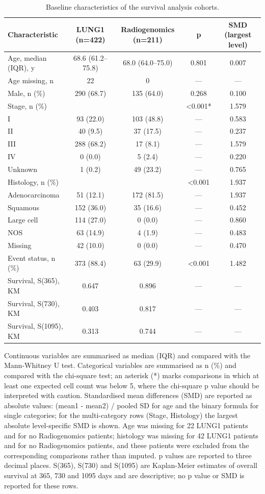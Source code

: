 \documentclass[a4paper,fleqn]{cas-sc}
\begin{document}
\begin{table}[htbp]
\centering
\small
\setlength{\tabcolsep}{4pt}
\caption{Baseline characteristics of the survival analysis cohorts.}
\label{tbl:1}
\begin{tabular}{@{}lcccc@{}}
\toprule
Characteristic & LUNG1 (n=422) & Radiogenomics (n=211) & p & SMD (largest level) \\
\midrule
Age, median (IQR), y & 68.6 (61.2--75.8) & 68.0 (64.0--75.0) & 0.801 & 0.007 \\
Age missing, n & 22 & 0 & --- & --- \\
Male, n (\%) & 290 (68.7) & 135 (64.0) & 0.268 & 0.100 \\
Stage, n (\%) &  &  & <0.001* & 1.579 \\
  I & 93 (22.0) & 103 (48.8) & --- & 0.583 \\
  II & 40 (9.5) & 37 (17.5) & --- & 0.237 \\
  III & 288 (68.2) & 17 (8.1) & --- & 1.579 \\
  IV & 0 (0.0) & 5 (2.4) & --- & 0.220 \\
  Unknown & 1 (0.2) & 49 (23.2) & --- & 0.765 \\
Histology, n (\%) &  &  & <0.001 & 1.937 \\
  Adenocarcinoma & 51 (12.1) & 172 (81.5) & --- & 1.937 \\
  Squamous & 152 (36.0) & 35 (16.6) & --- & 0.452 \\
  Large cell & 114 (27.0) & 0 (0.0) & --- & 0.860 \\
  NOS & 63 (14.9) & 4 (1.9) & --- & 0.483 \\
  Missing & 42 (10.0) & 0 (0.0) & --- & 0.470 \\
Event status, n (\%) & 373 (88.4) & 63 (29.9) & <0.001 & 1.482 \\
Survival, S(365), KM & 0.647 & 0.896 & --- & --- \\
Survival, S(730), KM & 0.403 & 0.817 & --- & --- \\
Survival, S(1095), KM & 0.313 & 0.744 & --- & --- \\
\bottomrule
\end{tabular}
\par\medskip\noindent\footnotesize Continuous variables are summarised as median (IQR) and compared with the Mann-Whitney U test. Categorical variables are summarised as n (\%) and compared with the chi-square test; an asterisk (*) marks comparisons in which at least one expected cell count was below 5, where the chi-square p value should be interpreted with caution. Standardised mean differences (SMD) are reported as absolute values: (mean1 - mean2) / pooled SD for age and the binary formula for single categories; for the multi-category rows (Stage, Histology) the largest absolute level-specific SMD is shown. Age was missing for 22 LUNG1 patients and for no Radiogenomics patients; histology was missing for 42 LUNG1 patients and for no Radiogenomics patients, and these patients were excluded from the corresponding comparisons rather than imputed. p values are reported to three decimal places. S(365), S(730) and S(1095) are Kaplan-Meier estimates of overall survival at 365, 730 and 1095 days and are descriptive; no p value or SMD is reported for these rows.

\end{table}
\end{document}
